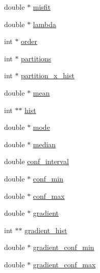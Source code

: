 \begin{DoxyCompactItemize}
\item 
double $\ast$ \hyperlink{struct__resultset1d_a55913b86c00ac5f7447073e0909fd988}{misfit}
\item 
double $\ast$ \hyperlink{struct__resultset1d_a4704008e7f077c87df1ff877a28c8a47}{lambda}
\item 
int $\ast$ \hyperlink{struct__resultset1d_a320c541fe9f8dacfd40506e1a3b8cbee}{order}
\item 
int $\ast$ \hyperlink{struct__resultset1d_a7bf37aed611a2403ab477c953f9618b2}{partitions}
\item 
int $\ast$ \hyperlink{struct__resultset1d_a7fdc65f3948298239e99392ec94a7201}{partition\+\_\+x\+\_\+hist}
\item 
double $\ast$ \hyperlink{struct__resultset1d_a6d957028bdd700c111e33557c126b0bb}{mean}
\item 
int $\ast$$\ast$ \hyperlink{struct__resultset1d_a15da81993e5ac31c7c46e459fb9c64d2}{hist}
\item 
double $\ast$ \hyperlink{struct__resultset1d_af94dbf778f066ba031edba593bfd51ff}{mode}
\item 
double $\ast$ \hyperlink{struct__resultset1d_a70ff2fe553b904ec962d71a89faf7147}{median}
\item 
double \hyperlink{struct__resultset1d_af429ddccce37c2e215fd662aae3b63be}{conf\+\_\+interval}
\item 
double $\ast$ \hyperlink{struct__resultset1d_a34a4e724bb47811c9e71316fb90d6e18}{conf\+\_\+min}
\item 
double $\ast$ \hyperlink{struct__resultset1d_ab66a2650b6cd6f3842e2de31b04a2c38}{conf\+\_\+max}
\item 
double $\ast$ \hyperlink{struct__resultset1d_aea8021e8282fb13b0156a60bb19fc56b}{gradient}
\item 
int $\ast$$\ast$ \hyperlink{struct__resultset1d_a367e8a7970df0ccbc667ce47b2d949be}{gradient\+\_\+hist}
\item 
double $\ast$ \hyperlink{struct__resultset1d_ab5aa2af42be5d69321323cc532a554f8}{gradient\+\_\+conf\+\_\+min}
\item 
double $\ast$ \hyperlink{struct__resultset1d_a1c33684db06e07014509d2d96711f20e}{gradient\+\_\+conf\+\_\+max}
\end{DoxyCompactItemize}


